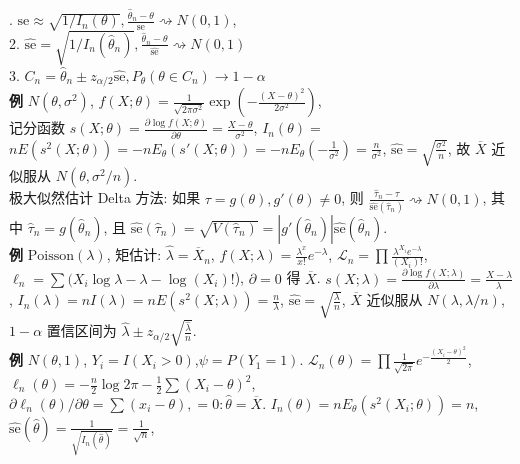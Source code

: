 \documentclass[a4paper, landscape,10pt]{article}
\begin{document}
\begin{multicols}{4}
. $\mathrm{se} \approx \sqrt{1 / I_n(\theta)}, \frac{\hat \theta_n - \theta}{\mathrm{se}} \rightsquigarrow N(0, 1)$, \\
2. $\hat {\mathrm{se}} = \sqrt{1 / I_n(\hat \theta_n)}, \frac{\hat \theta_n - \theta}{\hat {\mathrm{se}}} \rightsquigarrow N(0, 1)$\\
3. $C_n = \hat \theta_n \pm z_{\alpha/2} \hat {\mathrm{se}}, P_\theta(\theta \in C_n) \rightarrow 1 - \alpha$\\
{\bfseries 例} $N(\theta, \sigma ^ 2)$,
$f(X; \theta) = \frac{1}{\sqrt{2\pi\sigma^2}} \exp \left( - \frac{(X - \theta)^2}{2\sigma^2} \right)$,\\
记分函数 $s(X; \theta) = \frac{\partial \log f(X; \theta)}{\partial \theta} = \frac{X - \theta}{\sigma^2}$,
$I_n(\theta) = $ $n E(s^2(X; \theta)) = -n E_\theta(s'(X; \theta)) = -n E_\theta(-\frac 1 {\sigma^2}) = \frac {n} {\sigma^2}$,
$\hat {\mathrm{se}} = \sqrt{\frac{\sigma^2}{n}}$, 故 $\overline X$ 近似服从 $N(\theta, \sigma^2 / n)$. \\
极大似然估计 Delta 方法: 如果 $\tau = g(\theta), g'(\theta) \neq 0$, 则 $\frac {\hat \tau_n - \tau} {\hat {\mathrm{se}}(\hat \tau_n)} \rightsquigarrow N(0, 1)$,
其中 $\hat \tau_n = g(\hat \theta_n)$, 且 $\hat {\mathrm{se}}(\hat \tau_n) = \sqrt{V(\hat \tau_n)} = |g'(\hat \theta_n)| \hat {\mathrm{se}}(\hat \theta_n)$. \\
{\bfseries 例} $\mathrm{Poisson}(\lambda)$, 矩估计: $\hat \lambda = \overline X_n$,
$f(X; \lambda) = \frac{\lambda^x}{x!} e^{-\lambda}$,
$\mathcal{L}_n = \prod \frac{\lambda^{X_i}e^{-\lambda}}{(X_i)!}$, $\ell_n = \sum (X_i \log \lambda - \lambda - \log (X_i)!$), $\partial = 0$ 得 $\overline X$.
$s(X; \lambda) = \frac{\partial \log f(X; \lambda)}{\partial \lambda} = \frac{X - \lambda}{\lambda}$,
$I_n(\lambda) = n I(\lambda) = n E(s^2(X; \lambda)) = \frac{n}{\lambda}$, $\hat {\mathrm{se}} = \sqrt{\frac{\lambda}{n}}$, 
$\overline X$ 近似服从 $N(\lambda, \lambda / n)$,
$1 - \alpha$ 置信区间为 $\hat \lambda \pm z_{\alpha/2} \sqrt{\frac {\hat \lambda} {n}}$. \\
{\bfseries 例} $N(\theta, 1)$, $Y_i = I(X_i > 0)$,$\psi = P(Y_1 = 1)$.
$\mathcal{L}_n(\theta) = \prod \frac{1}{\sqrt{2\pi}} e^{-\frac{(X_i - \theta)^2}{2}}$,
$\ell_n(\theta) = -\frac{n}{2} \log 2\pi - \frac{1}{2} \sum (X_i - \theta)^2$,
$\partial \ell_n(\theta) / \partial \theta = \sum (x_i - \theta), = 0 : \hat \theta = \overline X$.
$I_n(\theta) = n E_\theta(s^2(X_i; \theta)) = n$,
$\hat{\mathrm{se}}(\hat \theta) = \frac{1}{\sqrt{I_n(\hat \theta)}} = \frac{1}{\sqrt{n}}$,

\end{multicols}
\end{document}
